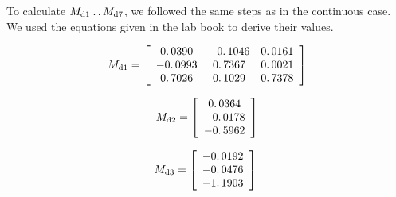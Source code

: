 \documentclass[11pt]{article}
\begin{document}
\vspace{1em}

\begin{par}
	\begin{flushleft}
		To calculate $M_{\mathrm{d1}\;} \ldotp \ldotp M_{\mathrm{d7}}$, we followed the same steps as in the continuous case. We used the equations given in the lab book to derive their values. 
	\end{flushleft}
\end{par}

\vspace{1em}

\begin{par}
	$$M_{\mathrm{d1}} =\left\lbrack \begin{array}{ccc}\linebreak 
	0\ldotp 0390 & -0\ldotp 1046 & 0\ldotp 0161\\\linebreak 
	-0\ldotp 0993 & 0\ldotp 7367 & 0\ldotp 0021\\\linebreak 
	0\ldotp 7026 & 0\ldotp 1029 & 0\ldotp 7378\linebreak 
	\end{array}\right\rbrack$$
\end{par}

\vspace{1em}

\begin{par}
	$$M_{\mathrm{d2}} =\left\lbrack \begin{array}{c}\linebreak 
	0\ldotp 0364\\\linebreak 
	-0\ldotp 0178\\\linebreak 
	-0\ldotp 5962\linebreak 
	\end{array}\right\rbrack$$
\end{par}

\vspace{1em}

\begin{par}
	$$M_{\mathrm{d3}} =\left\lbrack \begin{array}{c}\linebreak 
	-0\ldotp 0192\\\linebreak 
	-0\ldotp 0476\\\linebreak 
	-1\ldotp 1903\linebreak 
	\end{array}\right\rbrack \;$$
\end{par}
\end{document}
